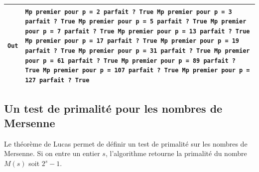 \documentclass[titlepage]{article}
\begin{document}
    \begin{tabularx}{12cm}{|p{0.60cm}|X|}
        \hline
        \texttt{Out}
        &
        \texttt{Mp premier pour p = 2\newline
        parfait ? True\newline
        Mp premier pour p = 3\newline
        parfait ? True\newline
        Mp premier pour p = 5\newline
        parfait ? True\newline
        Mp premier pour p = 7\newline
        parfait ? True\newline
        Mp premier pour p = 13\newline
        parfait ? True\newline
        Mp premier pour p = 17\newline
        parfait ? True\newline
        Mp premier pour p = 19\newline
        parfait ? True\newline
        Mp premier pour p = 31\newline
        parfait ? True\newline
        Mp premier pour p = 61\newline
        parfait ? True\newline
        Mp premier pour p = 89\newline
        parfait ? True\newline
        Mp premier pour p = 107\newline
        parfait ? True\newline
        Mp premier pour p = 127\newline
        parfait ? True}
        \\
        \hline
    \end{tabularx}
    \bigbreak

    \subsection{Un test de primalité pour les nombres de Mersenne}

    Le théorème de Lucas permet de définir un test de primalité sur les nombres de Mersenne.
    Si on entre un entier $s$, l'algorithme retourne la primalité du nombre $M(s)$ soit $2^s -1$.

    
\end{document}
